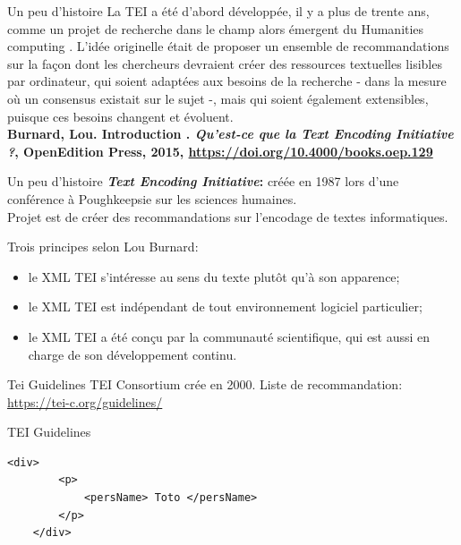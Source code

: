 \begin{frame}{Un peu d'histoire}
    \centering
    \small{
    \og La TEI a été d'abord développée, il y a plus de trente ans, comme un projet de recherche dans le champ alors émergent du \og Humanities computing \fg. L'idée originelle était de proposer un ensemble de recommandations sur la façon dont les chercheurs devraient créer des ressources textuelles \og lisibles par ordinateur\fg, qui soient adaptées aux besoins de la recherche - dans la mesure où un consensus existait sur le sujet -, mais qui soient également extensibles, puisque ces besoins changent et évoluent.\fg
    }\\
    \textbf{Burnard, Lou. \og Introduction \fg. \textit{Qu'est-ce que la Text Encoding Initiative ?}, OpenEdition Press, 2015, \url{https://doi.org/10.4000/books.oep.129}}
\end{frame}

\begin{frame}{Un peu d'histoire}
    \textbf{\textit{Text Encoding Initiative}:} créée en 1987 lors d'une conférence à Poughkeepsie sur les sciences humaines.\\
    Projet est de créer des recommandations sur l'encodage de textes informatiques.

    \begin{block}{Trois principes selon Lou Burnard:}
    \begin{itemize}
        \item le XML TEI s'intéresse au sens du texte plutôt qu'à son apparence;
        \item le XML TEI est indépendant de tout environnement logiciel particulier;
        \item le XML TEI a été conçu par la communauté scientifique, qui est aussi en charge de son développement continu.
    \end{itemize}
        
    \end{block}
\end{frame}

\begin{frame}{Tei Guidelines}
    TEI Consortium crée en 2000. Liste de recommandation: \url{https://tei-c.org/guidelines/}
\end{frame}

\begin{frame}[fragile]{TEI Guidelines}
    \begin{lstlisting}[numbers=none]
    <div>
        <p> 
            <persName> Toto </persName>
        </p>
    </div>
    \end{lstlisting}
\end{frame}

